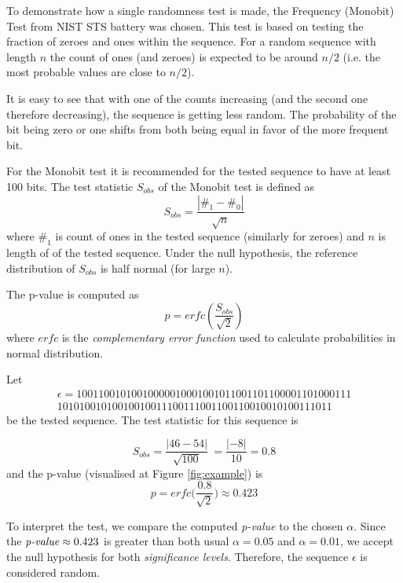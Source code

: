 \documentclass[
  digital,     %
  oneside,     %
  nosansbold,  %
  nocolorbold, %
  nolof,         %
  nolot,         %
]{fithesis4}
\begin{document}
To demonstrate how a single randomness test is made, the Frequency (Monobit) Test from NIST STS battery was chosen. \cite[p. 2-2]{nist_special} This test is based on testing the fraction of zeroes and ones within the sequence. For a random sequence with length $n$ the  count of ones (and zeroes) is expected to be around $n/2$ (i.e. the most probable values are close to $n/2$). 

It is easy to see that with one of the counts increasing (and the second one therefore decreasing), the sequence is getting less random. The probability of the bit being zero or one shifts from both being equal in favor of the more frequent bit.

For the Monobit test it is recommended for the tested sequence to have at least 100 bits. The test statistic $S_{obs}$ of the Monobit test is defined as \[S_{obs} = \dfrac{|\#_1 - \#_0|}{\sqrt{n}}\] where $\#_1$ is count of ones in the tested sequence (similarly for zeroes) and $n$ is length of of the tested sequence. Under the null hypothesis, the reference distribution of $S_{obs}$ is half normal (for large $n$). 

The p-value is computed as \[ p = erfc(\dfrac{S_{obs}}{\sqrt{2}}) \] where $erfc$ is the \emph{complementary error function} used to calculate probabilities in normal distribution.

 Let
\[\begin{split}
    \epsilon = 10011001010010000010001001011001101100001101000111\\10101001010010010011100111001100110010010100111011
\end{split}\]
 be the tested sequence. The test statistic for this sequence is 

 \[S_{obs} = \dfrac{|46 - 54|}{\sqrt{100}}\ = \dfrac{|-8|}{10} = 0.8\]
 and the p-value (visualised at Figure \ref{fig:example}) is 
 \[p = erfc\biggl(\dfrac{0.8}{\sqrt{2}}\biggr) \approx 0.423\]

To interpret the test, we compare the computed \emph{p-value} to the chosen $\alpha$. Since the $\emph{p-value} \approx 0.423$ is greater than both usual $\alpha = 0.05$ and $\alpha = 0.01$, we accept the null hypothesis for both \emph{significance levels}. Therefore, the sequence $\epsilon$ is considered random.
\end{document}
